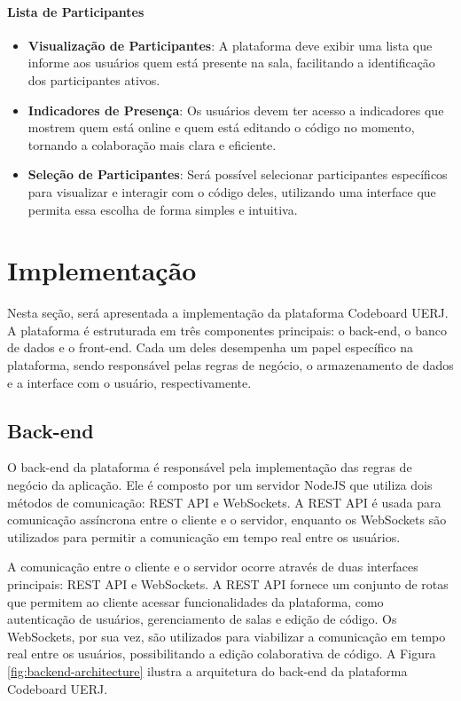 \paragraph{Lista de Participantes}

\begin{itemize}
    \item \textbf{Visualização de Participantes}: A plataforma deve exibir uma lista que informe aos usuários quem está presente na sala, facilitando a identificação dos participantes ativos.
    \item \textbf{Indicadores de Presença}: Os usuários devem ter acesso a indicadores que mostrem quem está online e quem está editando o código no momento, tornando a colaboração mais clara e eficiente.
    \item \textbf{Seleção de Participantes}: Será possível selecionar participantes específicos para visualizar e interagir com o código deles, utilizando uma interface que permita essa escolha de forma simples e intuitiva.
\end{itemize}


\section{Implementação}

Nesta seção, será apresentada a implementação da plataforma Codeboard UERJ. A plataforma é estruturada em três componentes principais: o back-end, o banco de dados e o front-end. Cada um deles desempenha um papel específico na plataforma, sendo responsável pelas regras de negócio, o armazenamento de dados e a interface com o usuário, respectivamente.

\subsection{Back-end}

O back-end da plataforma é responsável pela implementação das regras de negócio da aplicação. Ele é composto por um servidor NodeJS que utiliza dois métodos de comunicação: REST API e WebSockets. A REST API é usada para comunicação assíncrona entre o cliente e o servidor, enquanto os WebSockets são utilizados para permitir a comunicação em tempo real entre os usuários.

A comunicação entre o cliente e o servidor ocorre através de duas interfaces principais: REST API e WebSockets. A REST API fornece um conjunto de rotas que permitem ao cliente acessar funcionalidades da plataforma, como autenticação de usuários, gerenciamento de salas e edição de código. Os WebSockets, por sua vez, são utilizados para viabilizar a comunicação em tempo real entre os usuários, possibilitando a edição colaborativa de código. A Figura \ref{fig:backend-architecture} ilustra a arquitetura do back-end da plataforma Codeboard UERJ.

